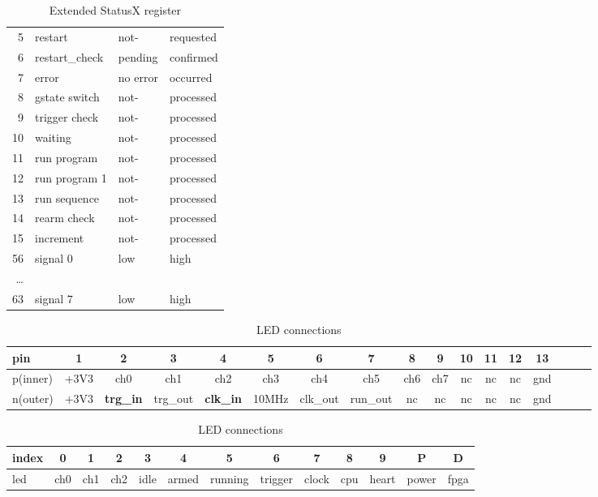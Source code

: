 \documentclass{article}
\begin{document}
\begin{table}[htb]
\begin{minipage}{.5\textwidth}
\begin{tabular}{rlll}
		 5  & restart  	  	  & not-	  	  	& requested   \\
		 6  & restart\_check  & pending				& confirmed   \\
		 7  & error           & no error      & occurred    \\\hline
		 8  & gstate switch   & not-          & processed   \\
		 9  & trigger check   & not-          & processed   \\
		10  & waiting         & not-          & processed   \\
		11  & run program     & not-          & processed   \\
		12  & run program 1   & not-          & processed   \\
		13  & run sequence    & not-          & processed   \\
		14  & rearm check     & not-          & processed   \\
		15  & increment       & not-          & processed   \\\hline
		56  & signal 0        & low           & high        \\
		\dots  &&&\\
		63  & signal 7        & low           & high        \\
		\end{tabular}
	\caption{Extended StatusX register}
	\label{statusx_register}
  \end{minipage}
\end{table}

\begin{table}[htb]
	\begin{tabular}{l||cccccccccccccccc}
		pin      & 1    & 2                & 3        & 4                & 5     & 6        & 7        & 8   & 9   & 10 & 11 & 12 & 13  \\\hline
		p(inner) & +3V3 & ch0              & ch1      & ch2              & ch3   & ch4      & ch5      & ch6 & ch7 & nc & nc & nc & gnd \\
		n(outer) & +3V3 & \textbf{trg\_in} & trg\_out & \textbf{clk\_in} & 10MHz & clk\_out & run\_out & nc  & nc  & nc & nc & nc & gnd \\
	\end{tabular}
	\caption{DIO connections (\textbf{input}, output)}
	\label{dio_connections}
	\begin{tabular}{l||ccc|ccc|cc|cccc}
		index & 0    & 1    & 2    & 3    & 4     & 5       & 6       & 7     & 8     & 9     & P     & D \\\hline
		led   & ch0  & ch1  & ch2  & idle & armed & running & trigger & clock & cpu   & heart & power & fpga
	\end{tabular}
	\caption{LED connections}
	\label{led_connections}
\end{table}
\end{document}
